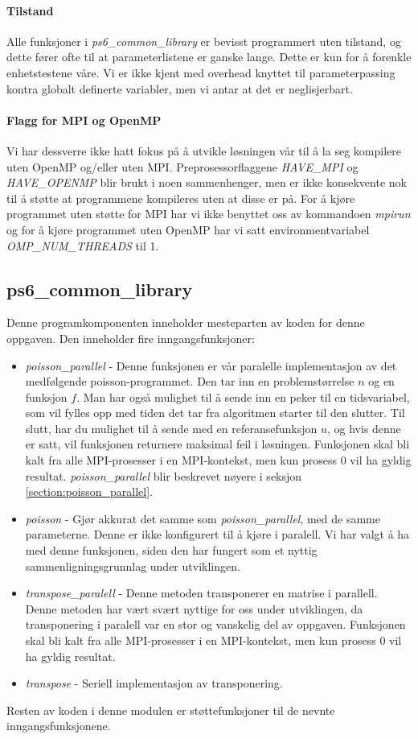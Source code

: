 \documentclass{article}
\begin{document}
\paragraph{Tilstand}
Alle funksjoner i \emph{ps6\_common\_library} er bevisst programmert uten tilstand, og dette fører ofte til at parameterlistene er ganske lange. Dette er kun for å forenkle enhetstestene våre. Vi er ikke kjent med overhead knyttet til parameterpassing kontra globalt definerte variabler, men vi antar at det er neglisjerbart.

\paragraph{Flagg for MPI og OpenMP}
Vi har dessverre ikke hatt fokus på å utvikle løsningen vår til å la seg kompilere uten OpenMP og/eller uten MPI. Preprosessorflaggene \emph{HAVE\_MPI} og \emph{HAVE\_OPENMP} blir brukt i noen sammenhenger, men er ikke konsekvente nok til å støtte at programmene kompileres uten at disse er på. For å kjøre programmet uten støtte for MPI har vi ikke benyttet oss av kommandoen \emph{mpirun} og for å kjøre programmet uten OpenMP har vi satt environmentvariabel \emph{OMP\_NUM\_THREADS} til 1.

\subsection{ps6\_common\_library}
Denne programkomponenten inneholder mesteparten av koden for denne oppgaven. Den inneholder fire inngangsfunksjoner:
\begin{itemize}
	\item \emph{poisson\_parallel} - Denne funksjonen er vår paralelle implementasjon av det medfølgende poisson-programmet. Den tar inn en problemstørrelse $n$ og en funksjon $f$. Man har også mulighet til å sende inn en peker til en tidsvariabel, som vil fylles opp med tiden det tar fra algoritmen starter til den slutter. Til slutt, har du mulighet til å sende med en referansefunksjon $u$, og hvis denne er satt, vil funksjonen returnere maksimal feil i løsningen. Funksjonen skal bli kalt fra alle MPI-prosesser i en MPI-kontekst, men kun prosess 0 vil ha gyldig resultat. \emph{poisson\_parallel} blir beskrevet nøyere i seksjon \ref{section:poisson_parallel}.
	\item \emph{poisson} - Gjør akkurat det samme som \emph{poisson\_parallel}, med de samme parameterne. Denne er ikke konfigurert til å kjøre i paralell. Vi har valgt å ha med denne funksjonen, siden den har fungert som et nyttig sammenligningsgrunnlag under utviklingen.
	\item \emph{transpose\_paralell} - Denne metoden transponerer en matrise i parallell. Denne metoden har vært svært nyttige for oss under utviklingen, da transponering i paralell var en stor og vanskelig del av oppgaven. Funksjonen skal bli kalt fra alle MPI-prosesser i en MPI-kontekst, men kun prosess 0 vil ha gyldig resultat.
	\item \emph{transpose} - Seriell implementasjon av transponering.
\end{itemize}
Resten av koden i denne modulen er støttefunksjoner til de nevnte inngangsfunksjonene.
\end{document}
